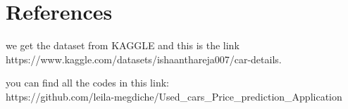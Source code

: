 \documentclass{article}
\begin{document}
\section{References}
\begin{flushleft}
\item[\ding{165}] we get the dataset from KAGGLE and this is the link \\ https://www.kaggle.com/datasets/ishaanthareja007/car-details.\\
\item[\ding{165}]you can find all the codes in this link:\\
https://github.com/leila-megdiche/Used\_cars\_Price\_prediction\_Application
\end{flushleft}
\end{document}
